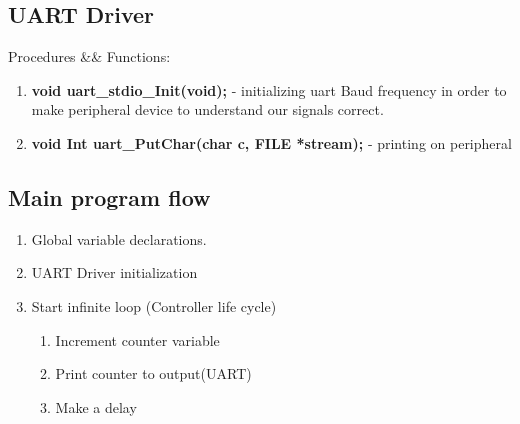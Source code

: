 
\newpage
\subsection{UART Driver}
Procedures \&\& Functions: 
\begin{enumerate}
	\item \textbf{void uart\_stdio\_Init(void);} - initializing uart Baud frequency in order to make peripheral device to understand our signals correct.
    \item \textbf{void Int uart\_PutChar(char c, FILE *stream);} - printing on peripheral
\end{enumerate}


\subsection{Main program flow}
\begin{enumerate}
	\item Global variable declarations.
	\item UART Driver initialization
	\item Start infinite loop (Controller life cycle)
    \begin{enumerate}
		\item Increment counter variable
        \item Print counter to output(UART)
        \item Make a delay
	\end{enumerate}
\end{enumerate}


\newpage
